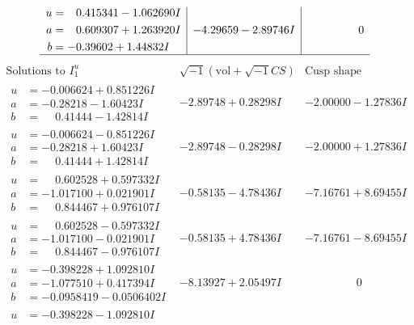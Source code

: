\documentclass[1p]{elsarticle_modified}
\theoremstyle{definition}
\newcommand{\I}{\sqrt{-1}}
\begin{document}
$$\begin{array}{c|c|c}
\begin{aligned}
u &= \phantom{-}0.415341 - 1.062690 I \\
a &= \phantom{-}0.609307 + 1.263920 I \\
b &= -0.39602 + 1.44832 I\end{aligned}
 & -4.29659 - 2.89746 I & \phantom{-0.000000 } 0\\
 \hline 
 \end{array}$$\newpage$$\begin{array}{c|c|c}  
\text{Solutions to }I^u_{1}& \I (\text{vol} + \sqrt{-1}CS) & \text{Cusp shape}\\
 \hline 
\begin{aligned}
u &= -0.006624 + 0.851226 I \\
a &= -0.28218 - 1.60423 I \\
b &= \phantom{-}0.41444 - 1.42814 I\end{aligned}
 & -2.89748 + 0.28298 I & -2.00000 - 1.27836 I \\ \hline\begin{aligned}
u &= -0.006624 - 0.851226 I \\
a &= -0.28218 + 1.60423 I \\
b &= \phantom{-}0.41444 + 1.42814 I\end{aligned}
 & -2.89748 - 0.28298 I & -2.00000 + 1.27836 I \\ \hline\begin{aligned}
u &= \phantom{-}0.602528 + 0.597332 I \\
a &= -1.017100 + 0.021901 I \\
b &= \phantom{-}0.844467 + 0.976107 I\end{aligned}
 & -0.58135 - 4.78436 I & -7.16761 + 8.69455 I \\ \hline\begin{aligned}
u &= \phantom{-}0.602528 - 0.597332 I \\
a &= -1.017100 - 0.021901 I \\
b &= \phantom{-}0.844467 - 0.976107 I\end{aligned}
 & -0.58135 + 4.78436 I & -7.16761 - 8.69455 I \\ \hline\begin{aligned}
u &= -0.398228 + 1.092810 I \\
a &= -1.077510 + 0.417394 I \\
b &= -0.0958419 - 0.0506402 I\end{aligned}
 & -8.13927 + 2.05497 I & \phantom{-0.000000 } 0 \\ \hline\begin{aligned}
u &= -0.398228 - 1.092810 I \\

\end{aligned}
\end{array}$$
\end{document}
